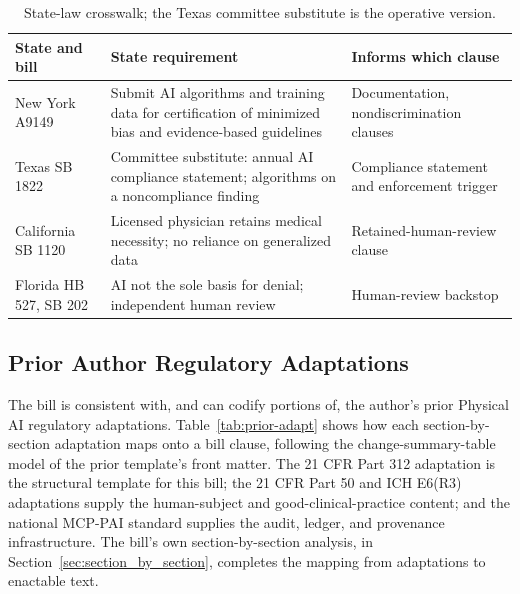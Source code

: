 \begin{table}[ht]
\centering
\begin{tabularx}{\textwidth}{L{4.6cm} Y L{3.3cm}}
\toprule
\textbf{State and bill} & \textbf{State requirement} & \textbf{Informs which clause} \\
\midrule
New York A9149 \cite{ny-a9149} & Submit AI algorithms and training data for certification of minimized bias and evidence-based guidelines & Documentation, nondiscrimination clauses \\
Texas SB 1822 \cite{tx-sb1822} & Committee substitute: annual AI compliance statement; algorithms on a noncompliance finding & Compliance statement and enforcement trigger \\
California SB 1120 \cite{ca-sb1120} & Licensed physician retains medical necessity; no reliance on generalized data & Retained-human-review clause \\
Florida HB 527, SB 202 \cite{fl-hb527} & AI not the sole basis for denial; independent human review & Human-review backstop \\
\bottomrule
\end{tabularx}
\caption{State-law crosswalk; the Texas committee substitute is the operative version.}
\label{tab:prior-state}
\end{table}

\subsection{Prior Author Regulatory Adaptations}

The bill is consistent with, and can codify portions of, the author's prior
Physical AI regulatory adaptations. Table~\ref{tab:prior-adapt} shows how each
section-by-section adaptation maps onto a bill clause, following the
change-summary-table model of the prior template's front matter. The 21 CFR Part
312 adaptation is the structural template for this bill; the 21 CFR Part 50 and
ICH E6(R3) adaptations supply the human-subject and good-clinical-practice
content; and the national MCP-PAI standard supplies the audit, ledger, and
provenance infrastructure. The bill's own section-by-section analysis, in
Section~\ref{sec:section_by_section}, completes the mapping from adaptations
to enactable text.

